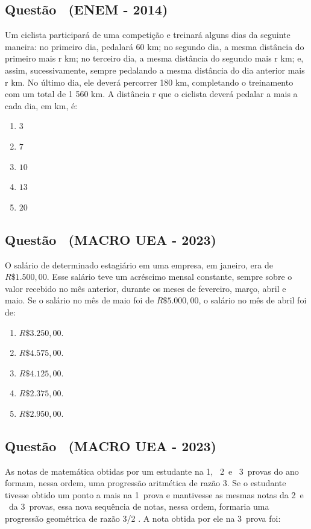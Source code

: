 \documentclass[12pt]{article}
\newcounter{questao}
\newcommand{\novaquestao}[1]{%
  \stepcounter{questao}%
  \subsection*{Questão \thequestao\ (#1)}%
}
\begin{document}
\begin{multicols}{2}
        \novaquestao{ENEM - 2014}
        
            Um ciclista participará de uma competição e treinará alguns dias da seguinte maneira: no primeiro dia, pedalará 60 km; no segundo dia, a mesma distância do primeiro mais r km; no terceiro dia, a mesma distância do segundo mais r km; e, assim, sucessivamente, sempre pedalando a mesma distância do dia anterior mais r km. No último dia, ele deverá percorrer 180 km, completando o treinamento com um total de 1 560 km. A distância r que o ciclista deverá pedalar a mais a cada dia, em km, é:

            \begin{enumerate}[label=(\alph*), noitemsep]
                \item $3$
                \item $7$
                \item $10$
                \item $13$
                \item $20$
            \end{enumerate}
        
        \novaquestao{MACRO UEA - 2023}
            O salário de determinado estagiário em uma empresa, em janeiro, era de $R\$ 1.500,00$. Esse salário teve um acréscimo mensal constante, sempre sobre o valor recebido no mês anterior, durante os meses de fevereiro, março, abril e maio. Se o salário no mês de maio foi de $R\$ 5.000,00$, o salário no mês de abril foi de:

            \begin{enumerate}[label=(\alph*), noitemsep]
                \item $R\$ 3.250,00.$
                \item $R\$ 4.575,00.$
                \item $R\$ 4.125,00.$
                \item $R\$ 2.375,00.$               
                \item $R\$ 2.950,00.$

            \end{enumerate}
        
        \novaquestao{MACRO UEA - 2023}
            As notas de matemática obtidas por um estudante na 1\textordfeminine, \ 2\textordfeminine \ e \ 3\textordfeminine \ provas do ano formam, nessa ordem, uma progressão aritmética de razão 3. Se o estudante tivesse obtido um ponto a mais na 1\textordfeminine \ prova e mantivesse as mesmas notas da 2\textordfeminine \  e \ da 3\textordfeminine \ provas, essa nova sequência de notas, nessa ordem, formaria uma progressão geométrica de razão 3/2 . A nota obtida por ele na 3\textordfeminine \  prova foi:


\end{multicols}
\end{document}
